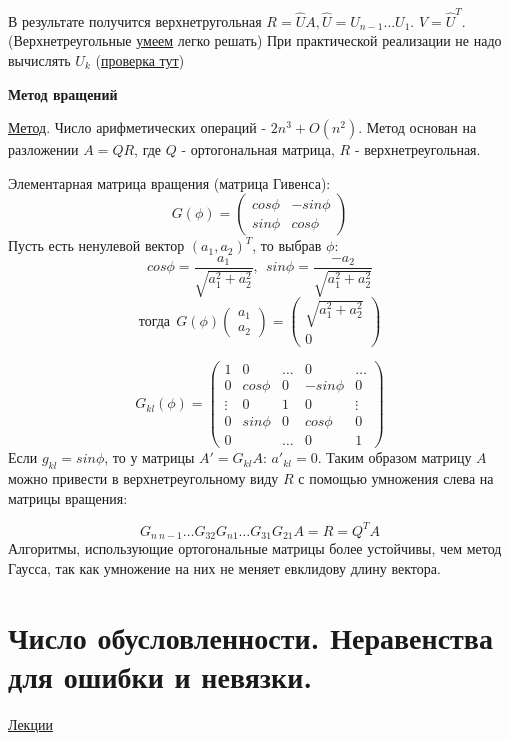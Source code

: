 \documentclass[specialist, subf, href, colorlinks=true, 12pt, times, mtpro, final]{disser}
\theoremstyle{definition}
\begin{document}
{	В результате получится верхнетругольная $R = \hat{U} A, \hat{U} = U_{n-1} \dots U_1$. $V = \hat{U}^T$. (Верхнетреугольные \hyperlink {lects.51}{умеем} легко решать) При практической реализации не надо вычислять $U_k$ (\hyperlink {lects.55}{проверка тут}) 
	 
	\begin{center} \textbf{Метод вращений} \end{center}

	\hyperlink {lects.55}{Метод}. Число арифметических операций - $2n^3 + O(n^2)$. Метод основан на разложении $A = QR$, где $Q$ - ортогональная матрица, $R$ - верхнетреугольная.

	Элементарная матрица вращения (матрица Гивенса):
	$$
	G(\phi) = \left(
	\begin{array}{cc}
		cos \phi  & -sin \phi \\
		sin \phi & cos \phi
		\end{array}
		\right)
	$$
	Пусть есть ненулевой вектор $(a_1, a_2)^T$, то выбрав $\phi:$ 
	$$cos \phi = \frac{a_1}{\sqrt{a_1^2 + a_2^2}}, \ \ sin \phi = \frac{-a_2}{\sqrt{a_1^2 + a_2^2}}$$
	$$ \text{тогда} \ \ G(\phi) \left( \begin{array}{cc}
		a_1 \\
		a_2
		\end{array} \right) = \left( \begin{array}{cc}
		\sqrt{a_1^2 + a_2^2} \\
		0
		\end{array} \right)$$

	$$
	G_{kl}(\phi) = \left(
	\begin{array}{ccccc}
		1 & 0 & \dots & 0 & \dots \\
		0 & cos \phi & 0 & -sin \phi & 0 \\
		\vdots & 0 & 1 & 0 & \vdots \\
		0 & sin \phi & 0 & cos \phi & 0 \\
		0 & & \dots & 0 & 1 		
		\end{array}
		\right)	
	$$
	Если $g_{kl} = sin \phi$, то у матрицы $A' = G_{kl} A$: $a'_{kl} = 0$. Таким образом матрицу $A$ можно привести в верхнетреугольному виду $R$ с помощью умножения слева на матрицы вращения:

	$$
	G_{n \ n-1} \dots G_{32} G_{n1} \dots G_{31} G_{21} A = R = Q^T A	
	$$ 
	Алгоритмы, использующие ортогональные матрицы более устойчивы, чем метод Гаусса, так как умножение на них не меняет евклидову длину вектора.

\section {Число обусловленности. Неравенства для ошибки и невязки.}
    \hyperlink {lects.56}{Лекции}\\

}
\end{document}
